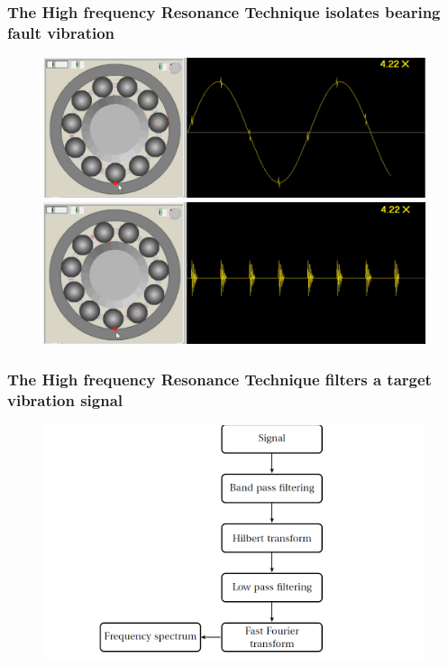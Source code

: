 \documentclass{beamer}
\begin{document}



\begin{frame}
	\frametitle{The High frequency Resonance Technique isolates bearing fault vibration}
	\begin{figure}[H]
		\centering
		\includegraphics[width=0.8\linewidth]{outer-race1}
		\includegraphics[width=0.8\linewidth]{outer-race2}
	\end{figure}
\end{frame}


\begin{frame}
	\frametitle{The High frequency Resonance Technique filters a target vibration signal}
	\begin{figure}[H]
		\centering
		
		\includegraphics[width=0.8\linewidth]{hfrt}
	\end{figure}
\end{frame}
\end{document}
